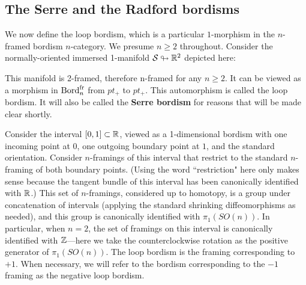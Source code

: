 \documentclass{amsart}
\begin{document}
\subsection{The Serre and the Radford bordisms}
We now define the loop bordism, which is a particular $1$-morphism in the $n$-framed bordism $n$-category.  We presume $n \geq 2$ throughout.  
Consider the normally-oriented immersed 1-manifold $\mathcal S \looparrowright \mathbb R^2$ depicted here:
\begin{center}
\end{center}
\nid This manifold is 2-framed, therefore n-framed for any $n \geq 2$.  It can be viewed as a morphism in $\mathrm{Bord}^\mathrm{fr}_n$ from $pt_+$ to $pt_+$.  This automorphism is called the loop bordism.  It will also be called the {\bfseries Serre bordism} for reasons that will be made clear shortly.   

\begin{remark}
Consider the interval $[0,1] \subset \mathbb R$, viewed as a 1-dimensional bordism with one incoming  point at $0$, one outgoing boundary point at $1$, and the standard orientation.  Consider $n$-framings of this interval that restrict to the standard $n$-framing of both boundary points.  (Using the word ``restriction" here only makes sense because the tangent bundle of this interval has been canonically identified with $\mathbb R$.)  This set of $n$-framings, considered up to homotopy, is a group under concatenation of intervals (applying the standard shrinking diffeomorphisms as needed), and this group is canonically identified with $\pi_1(SO(n))$.  In particular, when $n=2$, the set of framings on this interval is canonically identified with $\mathbb Z$---here we take the counterclockwise rotation as the positive generator of $\pi_1(SO(n))$.  The loop bordism is the framing corresponding to $+1$.  When necessary, we will refer to the bordism corresponding to the $-1$ framing as the negative loop bordism.
\end{remark}
\end{document}
